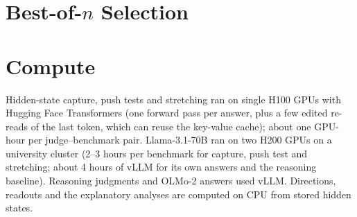 \section{Best-of-$n$ Selection}
\label{app:bon}

\begin{table}[h]
\centering
\small

\caption{Best-of-$n$ accuracy (exploratory protocol): the share of groups (questions; question $\times$ answering model for same-model sets; only groups with at least one right and one wrong answer) in which the top-scored answer is right, for random choice and the forced verdict, and the gain of each readout over the verdict (mean over judges; bold: 95\% interval above 0).}
\label{tab:bon}
\end{table}

\section{Compute}

Hidden-state capture, push tests and stretching ran on single H100 GPUs with Hugging Face Transformers (one forward pass per answer, plus a few edited re-reads of the last token, which can reuse the key-value cache); about one GPU-hour per judge--benchmark pair. Llama-3.1-70B ran on two H200 GPUs on a university cluster (2--3 hours per benchmark for capture, push test and stretching; about 4 hours of vLLM for its own answers and the reasoning baseline). Reasoning judgments and OLMo-2 answers used vLLM. Directions, readouts and the explanatory analyses are computed on CPU from stored hidden states.
